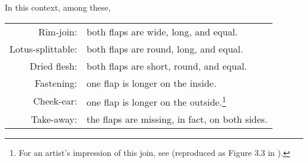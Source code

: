 \begin{translation}
    In this context, among these, 
%        
%        
%        
%        
%        
%        
%        
%        
%        
%
\begin{longtable}{rp{}}
 Rim-join: & 
both flaps are wide, long, and equal.\\

Lotus-splittable: & 
both flaps are round, long, and equal.\\

Dried flesh: & 
both flaps are short, round, and equal.\\

Fastening: & 
one flap is longer on the inside.\\

Cheek-ear: & 
one flap is longer on the outside.\footnote{For an artist's impression of this join, see 
\cite[291]{majn-1975} (reproduced as Figure 3.3 in \cites[155]{wuja-2003}).}\\
    
Take-away: & 
    the flaps are missing, in fact, on both sides.\\
    

\end{longtable}
\end{translation}
